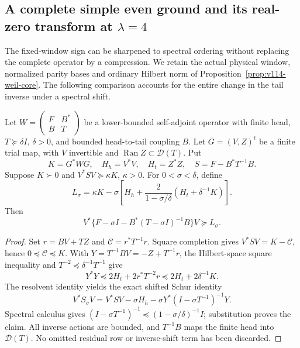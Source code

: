 \subsection*{A complete simple even ground and its real-zero transform at $\lambda=4$}

The fixed-window sign can be sharpened to spectral ordering without
replacing the complete operator by a compression. We retain the actual
physical window, normalized parity bases and ordinary Hilbert norm of
Proposition~\ref{prop:v114-weil-core}. The following comparison accounts
for the entire change in the tail inverse under a spectral shift.

\begin{lemma}
\label{lem:v140-shifted-schur}
Let $W=\left(\begin{smallmatrix}F&B^*\\B&T\end{smallmatrix}\right)$
be a lower-bounded self-adjoint operator with finite head,
$T\succeq\delta I$, $\delta>0$, and bounded head-to-tail coupling $B$.
Let $G=(V,Z)^t$ be a finite trial map, with $V$ invertible and
$\operatorname{Ran}Z\subset\mathcal D(T)$. Put
\[
 K=G^*WG,\quad H_h=V^*V,\quad H_t=Z^*Z,\quad
 S=F-B^*T^{-1}B.
\]
Suppose $K\succ0$ and $V^*SV\succeq\kappa K$, $\kappa>0$.
For $0<\sigma<\delta$, define
\begin{equation}\label{eq:v140-shifted-lower}
 L_\sigma=\kappa K-\sigma\left[H_h+
       \frac{2}{1-\sigma/\delta}(H_t+\delta^{-1}K)\right].
\end{equation}
Then
\[
 V^*\{F-\sigma I-B^*(T-\sigma I)^{-1}B\}V
 \succeq L_\sigma.
\]
\end{lemma}
\begin{proof}
Set $r=BV+TZ$ and $\mathcal C=r^*T^{-1}r$. Square completion gives
$V^*SV=K-\mathcal C$, hence $0\preceq\mathcal C\preceq K$.
With $Y=T^{-1}BV=-Z+T^{-1}r$, the Hilbert-space square inequality
and $T^{-2}\preceq\delta^{-1}T^{-1}$ give
\[
 Y^*Y\preceq2H_t+2r^*T^{-2}r
             \preceq2H_t+2\delta^{-1}K.
\]
The resolvent identity yields the exact shifted Schur identity
\[
 V^*S_\sigma V=V^*SV-\sigma H_h
       -\sigma Y^*(I-\sigma T^{-1})^{-1}Y.
\]
Spectral calculus gives
$(I-\sigma T^{-1})^{-1}\preceq(1-\sigma/\delta)^{-1}I$;
substitution proves the claim. All inverse actions are bounded,
and $T^{-1}B$ maps the finite head into $\mathcal D(T)$.
No omitted residual row or inverse-shift term has been discarded.
\end{proof}

